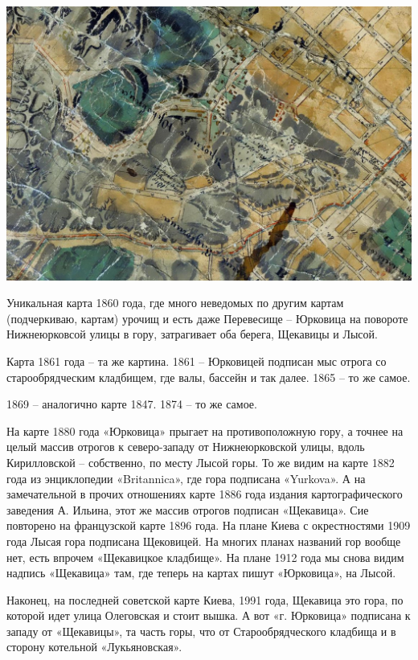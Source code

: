 \begin{center}
\includegraphics[width=\linewidth]{chast-kirvys/poisk-yourk/1847.jpg}
\end{center}

Уникальная карта 1860 года, где много неведомых по другим картам (подчеркиваю, картам) урочищ и есть даже Перевесище – Юрковица на повороте Нижнеюрковсой улицы в гору, затрагивает оба берега, Щекавицы и Лысой.

Карта 1861 года – та же картина. 1861 – Юрковицей подписан мыс отрога со старообрядческим кладбищем, где валы, бассейн и так далее. 1865 – то же самое.

1869 – аналогично карте 1847. 1874 – то же самое.

На карте 1880 года «Юрковица» прыгает на противоположную гору, а точнее на целый массив отрогов к северо-западу от Нижнеюрковской улицы, вдоль Кирилловской – собственно, по месту Лысой горы. То же видим на карте 1882 года из энциклопедии «Britannica», где гора подписана «Yurkova». А на замечательной в прочих отношениях карте 1886 года издания картографического заведения А. Ильина, этот же массив отрогов подписан «Щекавица». Сие повторено на французской карте 1896 года. На плане Киева с окрестностями 1909 года Лысая гора подписана Щековицей. На многих планах названий гор вообще нет, есть впрочем «Щекавицкое кладбище». На плане 1912 года мы снова видим надпись «Щекавица» там, где теперь на картах пишут «Юрковица», на Лысой.

Наконец, на последней советской карте Киева, 1991 года, Щекавица это гора, по которой идет улица Олеговская и стоит вышка. А вот «г. Юрковица» подписана к западу от «Щекавицы», та часть горы, что от Старообрядческого кладбища и в сторону котельной «Лукьяновская».

